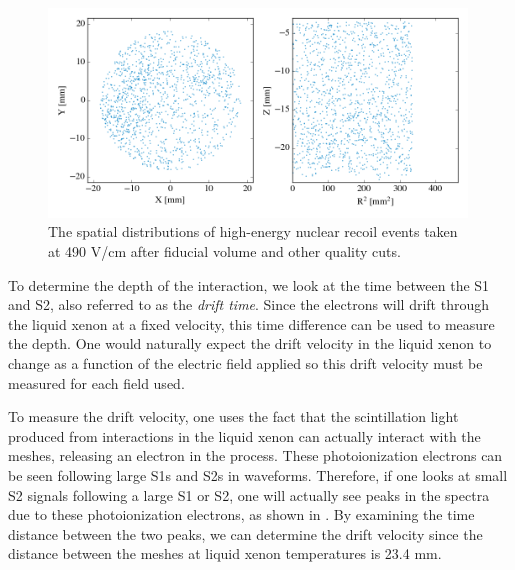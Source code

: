 \begin{figure}[t]
        \centering
	\includegraphics[width=0.99\textwidth]{nerix_position_reconstruction}
	\caption{The spatial distributions of high-energy nuclear recoil events taken at 490 V/cm after fiducial volume and other quality cuts.}
	\label{fig:nerix_position_reconstruction}
\end{figure}

To determine the depth of the interaction, we look at the time between the S1 and S2, also referred to as the \textit{drift time}.  Since the electrons will drift through the liquid xenon at a fixed velocity, this time difference can be used to measure the depth.  One would naturally expect the drift velocity in the liquid xenon to change as a function of the electric field applied so this drift velocity must be measured for each field used.

To measure the drift velocity, one uses the fact that the scintillation light produced from interactions in the liquid xenon can actually interact with the meshes, releasing an electron in the process.  These photoionization electrons can be seen following large S1s and S2s in waveforms.  Therefore, if one looks at small S2 signals following a large S1 or S2, one will actually see peaks in the spectra due to these photoionization electrons, as shown in .  By examining the time distance between the two peaks, we can determine the drift velocity since the distance between the meshes at liquid xenon temperatures is 23.4 mm.

